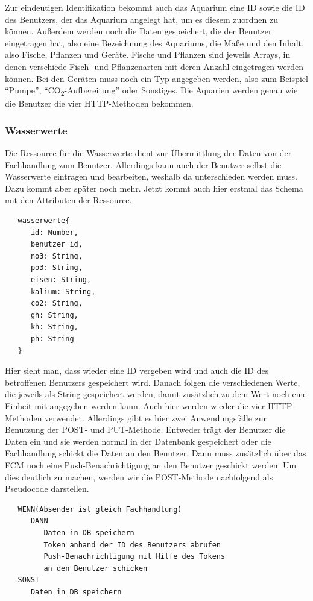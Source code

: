 Zur eindeutigen Identifikation bekommt auch das Aquarium eine ID sowie die ID des Benutzers, der das Aquarium angelegt hat, um es diesem zuordnen zu können. Außerdem werden noch die Daten gespeichert, die der Benutzer eingetragen hat, also eine Bezeichnung des Aquariums, die Maße und den Inhalt, also Fische, Pflanzen und Geräte. Fische und Pflanzen sind jeweils Arrays, in denen verschiede Fisch- und Pflanzenarten mit deren Anzahl eingetragen werden können. Bei den Geräten muss noch ein Typ angegeben werden, also zum Beispiel ``Pumpe'', ``CO\textsubscript{2}-Aufbereitung'' oder Sonstiges. Die Aquarien werden genau wie die Benutzer die vier HTTP-Methoden bekommen. 

\subsubsection{Wasserwerte}

Die Ressource für die Wasserwerte dient zur Übermittlung der Daten von der Fachhandlung zum Benutzer. Allerdings kann auch der Benutzer selbst die Wasserwerte eintragen und bearbeiten, weshalb da unterschieden werden muss. Dazu kommt aber später noch mehr. Jetzt kommt auch hier erstmal das Schema mit den Attributen der Ressource.

\begin{lstlisting}
   wasserwerte{
      id: Number,
      benutzer_id,
      no3: String,
      po3: String,
      eisen: String,
      kalium: String,
      co2: String,
      gh: String,
      kh: String,
      ph: String
   }
\end{lstlisting}

Hier sieht man, dass wieder eine ID vergeben wird und auch die ID des betroffenen Benutzers gespeichert wird. Danach folgen die verschiedenen Werte, die jeweils als String gespeichert werden, damit zusätzlich zu dem Wert noch eine Einheit mit angegeben werden kann. Auch hier werden wieder die vier HTTP-Methoden verwendet. Allerdings gibt es hier zwei Anwendungsfälle zur Benutzung der POST- und PUT-Methode. Entweder trägt der Benutzer die Daten ein und sie werden normal in der Datenbank gespeichert oder die Fachhandlung schickt die Daten an den Benutzer. Dann muss zusätzlich über das FCM noch eine Push-Benachrichtigung an den Benutzer geschickt werden. Um dies deutlich zu machen, werden wir die POST-Methode nachfolgend als Pseudocode darstellen.

\begin{lstlisting}
   WENN(Absender ist gleich Fachhandlung)
      DANN
         Daten in DB speichern
         Token anhand der ID des Benutzers abrufen
         Push-Benachrichtigung mit Hilfe des Tokens 
         an den Benutzer schicken
   SONST
      Daten in DB speichern
\end{lstlisting}

